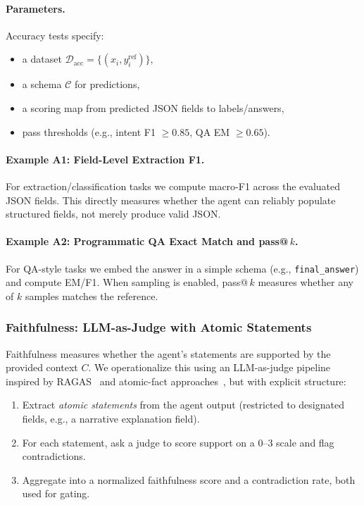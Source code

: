 \paragraph{Parameters.}
Accuracy tests specify:
\begin{itemize}[leftmargin=12pt]
    \item a dataset $\mathcal{D}_{\text{acc}} = \{(x_i, y_i^{\text{ref}})\}$,
    \item a schema $\mathcal{C}$ for predictions,
    \item a scoring map from predicted JSON fields to labels/answers,
    \item pass thresholds (e.g., intent F1 $\ge 0.85$, QA EM $\ge 0.65$).
\end{itemize}

\paragraph{Example A1: Field-Level Extraction F1.}
For extraction/classification tasks we compute macro-F1 across the evaluated JSON fields.
This directly measures whether the agent can reliably populate structured fields, not merely produce valid JSON.

\paragraph{Example A2: Programmatic QA Exact Match and pass@\,$k$.}
For QA-style tasks we embed the answer in a simple schema (e.g., \texttt{final\_answer}) and compute EM/F1.
When sampling is enabled, pass@\,$k$ measures whether any of $k$ samples matches the reference.

\subsubsection{Faithfulness: LLM-as-Judge with Atomic Statements}

Faithfulness measures whether the agent’s statements are supported by the provided context $C$.
We operationalize this using an LLM-as-judge pipeline inspired by RAGAS~\citep{es2023ragas} and atomic-fact approaches~\citep{atomicFacts2024}, but with explicit structure:

\begin{enumerate}[leftmargin=12pt]
    \item Extract \emph{atomic statements} from the agent output (restricted to designated fields, e.g., a narrative explanation field).
    \item For each statement, ask a judge to score support on a 0--3 scale and flag contradictions.
    \item Aggregate into a normalized faithfulness score and a contradiction rate, both used for gating.
\end{enumerate}

